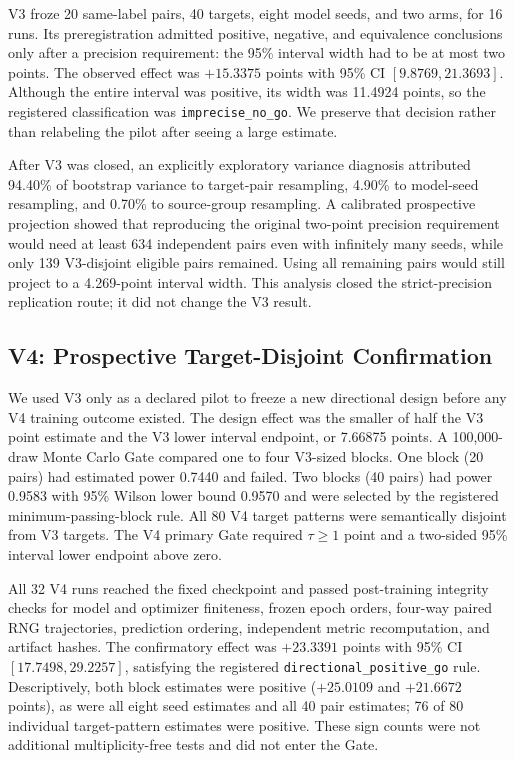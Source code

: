 V3 froze 20 same-label pairs, 40 targets, eight model seeds, and two arms,
for 16 runs.  Its preregistration admitted positive, negative, and
equivalence conclusions only after a precision requirement: the 95\%
interval width had to be at most two points.  The observed effect was
$+15.3375$ points with 95\% CI $[9.8769,21.3693]$.  Although the entire
interval was positive, its width was 11.4924 points, so the registered
classification was \texttt{imprecise\_no\_go}.  We preserve that decision
rather than relabeling the pilot after seeing a large estimate.

After V3 was closed, an explicitly exploratory variance diagnosis attributed
94.40\% of bootstrap variance to target-pair resampling, 4.90\% to model-seed
resampling, and 0.70\% to source-group resampling.  A calibrated prospective
projection showed that reproducing the original two-point precision
requirement would need at least 634 independent pairs even with infinitely
many seeds, while only 139 V3-disjoint eligible pairs remained.  Using all
remaining pairs would still project to a 4.269-point interval width.  This
analysis closed the strict-precision replication route; it did not change the
V3 result.

\subsection{V4: Prospective Target-Disjoint Confirmation}

We used V3 only as a declared pilot to freeze a new directional design before
any V4 training outcome existed.  The design effect was the smaller of half
the V3 point estimate and the V3 lower interval endpoint, or 7.66875 points.
A 100,000-draw Monte Carlo Gate compared one to four V3-sized blocks.  One
block (20 pairs) had estimated power 0.7440 and failed.  Two blocks (40 pairs)
had power 0.9583 with 95\% Wilson lower bound 0.9570 and were selected by the
registered minimum-passing-block rule.  All 80 V4 target patterns were
semantically disjoint from V3 targets.  The V4 primary Gate required
$\tau\geq1$ point and a two-sided 95\% interval lower endpoint above zero.

All 32 V4 runs reached the fixed checkpoint and passed post-training
integrity checks for model and optimizer finiteness, frozen epoch orders,
four-way paired RNG trajectories, prediction ordering, independent metric
recomputation, and artifact hashes.  The confirmatory effect was
$+23.3391$ points with 95\% CI $[17.7498,29.2257]$, satisfying the registered
\texttt{directional\_positive\_go} rule.  Descriptively, both block estimates
were positive ($+25.0109$ and $+21.6672$ points), as were all eight seed
estimates and all 40 pair estimates; 76 of 80 individual target-pattern
estimates were positive.  These sign counts were not additional
multiplicity-free tests and did not enter the Gate.

